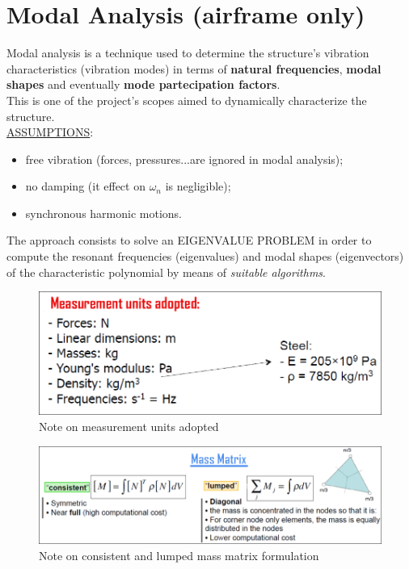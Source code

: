 \clearpage
\section*{Modal Analysis (airframe only)}
\noindent
Modal analysis is a technique used to determine the structure's vibration characteristics (vibration modes) in terms of \textbf{natural frequencies}, \textbf{modal shapes} and eventually \textbf{mode partecipation factors}. \\
This is one of the project's scopes aimed to dynamically characterize the structure. \\

\noindent
\underline{ASSUMPTIONS}:
\begin{itemize}
	\item free vibration (forces, pressures...are ignored in modal analysis);
	\item no damping (it effect on $\omega_{n}$ is negligible);
	\item synchronous harmonic motions.  
\end{itemize}

\smallskip
\noindent
The approach consists to solve an EIGENVALUE PROBLEM in order to compute the resonant frequencies (eigenvalues) and modal shapes (eigenvectors) of the characteristic polynomial by means of \emph{suitable algorithms}. 

\medskip
\begin{figure}[h!]
	\begin{center}
		\centering  		 		
		\includegraphics[width=0.8\linewidth]{PICTURES/2_Lama_truss/PNG/MU.png}
	\end{center}
	\caption{Note on measurement units adopted}
\end{figure}	

\begin{figure}[h!]
	\begin{center}
		\centering  		 		
		\includegraphics[width=1\linewidth]{PICTURES/2_Lama_truss/PNG/CL1.png}
	\end{center}
	\caption{Note on consistent and lumped mass matrix formulation}
\end{figure}	


